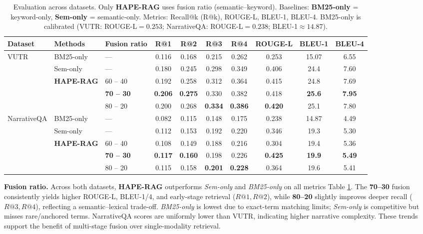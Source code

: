 \documentclass[10pt,twocolumn,letterpaper]{article}
\begin{document}
\begin{table}[t]
\small
\centering
\caption{Evaluation across datasets. Only \textbf{HAPE-RAG} uses fusion ratio (semantic--keyword). Baselines: \textbf{BM25-only} = keyword-only, \textbf{Sem-only} = semantic-only. Metrics: Recall@k (R@k), ROUGE-L, BLEU-1, BLEU-4. BM25-only is calibrated (VUTR: ROUGE-L$=0.253$; NarrativeQA: ROUGE-L$=0.238$; BLEU-1$\approx 14.87$).}
\label{tab:ratio_by_dataset_final}
\setlength{\tabcolsep}{6pt}
\begin{tabular}{l l l c c c c c c c}
\toprule
\textbf{Dataset} & \textbf{Methods} & \textbf{Fusion ratio} & \textbf{R@1} & \textbf{R@2} & \textbf{R@3} & \textbf{R@4} & \textbf{ROUGE-L} & \textbf{BLEU-1} & \textbf{BLEU-4} \\
\midrule
\multirow{5}{*}{VUTR}
& BM25-only   & ---        & 0.116 & 0.168 & 0.215 & 0.262 & 0.253 & 15.07 & 6.55 \\
& Sem-only    & ---        & 0.180 & 0.245 & 0.298 & 0.349 & 0.406 & 24.4 & 7.60 \\
& \multirow{3}{*}{\textbf{HAPE-RAG}} 
& 60 -- 40    & 0.192 & 0.258 & 0.312 & 0.364 & 0.415 & 24.8 & 7.69 \\
&              & \textbf{70 -- 30} & \textbf{0.206} & \textbf{0.275} & 0.330 & 0.382 & 0.418 & \textbf{25.6} & \textbf{7.95} \\
&              & 80 -- 20    & 0.200 & 0.268 & \textbf{0.334} & \textbf{0.386} & \textbf{0.420} & 25.1 & 7.80 \\
\midrule
\multirow{5}{*}{NarrativeQA}
& BM25-only   & ---        & 0.082 & 0.115 & 0.148 & 0.175 & 0.238 & 14.87 & 4.49 \\
& Sem-only    & ---        & 0.112 & 0.153 & 0.192 & 0.220 & 0.346 & 19.3 & 5.30 \\
& \multirow{3}{*}{\textbf{HAPE-RAG}} 
& 60 -- 40    & 0.108 & 0.149 & 0.188 & 0.216 & 0.304 & 19.4 & 5.36 \\
&              & \textbf{70 -- 30} & \textbf{0.117} & \textbf{0.160} & 0.198 & 0.226 & \textbf{0.425} & \textbf{19.9} & \textbf{5.49} \\
&              & 80 -- 20    & 0.115 & 0.158 & \textbf{0.201} & \textbf{0.228} & 0.364 & 19.6 & 5.41 \\
\bottomrule
\end{tabular}
\end{table}

\vspace{0.5em}
\textbf{Fusion ratio.} Across both datasets, \textbf{HAPE-RAG} outperforms \textit{Sem-only} and \textit{BM25-only} on all metrics Table \ref{tab:ratio_by_dataset_final}. The \textbf{70--30} fusion consistently yields higher ROUGE-L, BLEU-1/4, and early-stage retrieval (\(R@1, R@2\)), while \textbf{80--20} slightly improves deeper recall (\(R@3, R@4\)), reflecting a semantic–lexical trade-off. \textit{BM25-only} is lowest due to exact-term matching limits; \textit{Sem-only} is competitive but misses rare/anchored terms. NarrativeQA scores are uniformly lower than VUTR, indicating higher narrative complexity. These trends support the benefit of multi-stage fusion over single-modality retrieval.
\end{document}
